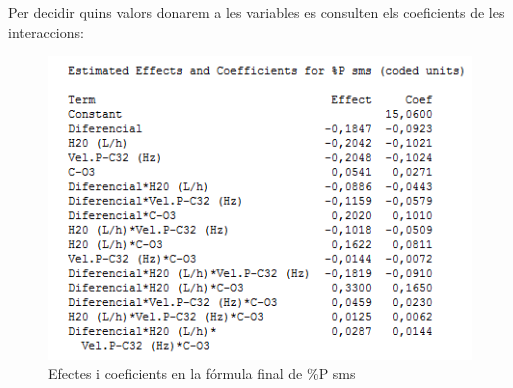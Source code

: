 \documentclass[a4paper]{article}
\begin{document}
Per decidir quins valors donarem a les variables es consulten els coeficients de les interaccions:

\begin{figure}[H]
	\centering
	\includegraphics{images/Coefs}
	\caption{Efectes i coeficients en la fórmula final de \%P sms}
	\label{fig:Coefs}
\end{figure} 	
\end{document}
